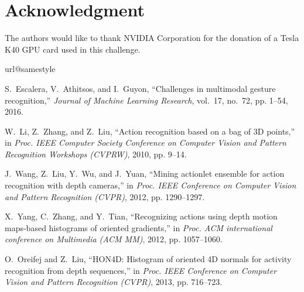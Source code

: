 \documentclass[10pt, a4paper, conference]{IEEEtran}
\begin{document}
\section*{Acknowledgment}
The authors would like to thank NVIDIA Corporation for the donation of a Tesla K40 GPU card used in this challenge.




\begin{thebibliography}{10}
\providecommand{\url}[1]{#1}
\csname url@samestyle\endcsname
\providecommand{\newblock}{\relax}
\providecommand{\bibinfo}[2]{#2}
\providecommand{\BIBentrySTDinterwordspacing}{\spaceskip=0pt\relax}
\providecommand{\BIBentryALTinterwordstretchfactor}{4}
\providecommand{\BIBentryALTinterwordspacing}{\spaceskip=\fontdimen2\font plus
\BIBentryALTinterwordstretchfactor\fontdimen3\font minus
  \fontdimen4\font\relax}
\providecommand{\BIBforeignlanguage}[2]{{\expandafter\ifx\csname l@#1\endcsname\relax
\typeout{** WARNING: IEEEtran.bst: No hyphenation pattern has been}\typeout{** loaded for the language `#1'. Using the pattern for}\typeout{** the default language instead.}\else
\language=\csname l@#1\endcsname
\fi
#2}}
\providecommand{\BIBdecl}{\relax}
\BIBdecl

S.~Escalera, V.~Athitsos, and I.~Guyon, ``Challenges in multimodal gesture
  recognition,'' \emph{Journal of Machine Learning Research}, vol.~17, no.~72,
  pp. 1--54, 2016.

W.~Li, Z.~Zhang, and Z.~Liu, ``Action recognition based on a bag of {3D}
  points,'' in \emph{Proc. IEEE Computer Society Conference on Computer Vision
  and Pattern Recognition Workshops (CVPRW)}, 2010, pp. 9--14.

J.~Wang, Z.~Liu, Y.~Wu, and J.~Yuan, ``Mining actionlet ensemble for action
  recognition with depth cameras,'' in \emph{Proc. IEEE Conference on Computer
  Vision and Pattern Recognition (CVPR)}, 2012, pp. 1290--1297.

X.~Yang, C.~Zhang, and Y.~Tian, ``Recognizing actions using depth motion
  maps-based histograms of oriented gradients,'' in \emph{Proc. ACM
  international conference on Multimedia (ACM MM)}, 2012, pp. 1057--1060.

O.~Oreifej and Z.~Liu, ``{HON4D}: Histogram of oriented {4D} normals for
  activity recognition from depth sequences,'' in \emph{Proc. IEEE Conference
  on Computer Vision and Pattern Recognition (CVPR)}, 2013, pp. 716--723.


\end{thebibliography}
\end{document}

